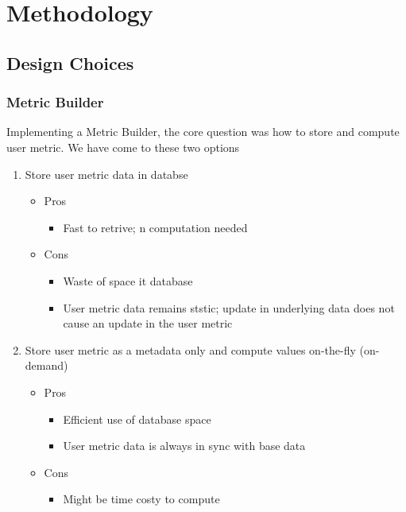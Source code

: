 \chapter{Methodology}

\section{Design Choices}

\subsection{Metric Builder}

Implementing a Metric Builder, the core question was how to store and compute user metric. We have come to these two options
\begin{enumerate}
  \item
    Store user metric data in databse
    \begin{itemize}
      \item
        Pros
        \begin{itemize}
          \item
            Fast to retrive; n computation needed
        \end{itemize}
      \item
        Cons
        \begin{itemize}
          \item
            Waste of space it database
          \item
            User metric data remains ststic; update in underlying data does not cause an update in the user metric
        \end{itemize}
    \end{itemize}
  \item
    Store user metric as a metadata only and compute values on-the-fly (on-demand)
    \begin{itemize}
      \item
        Pros
        \begin{itemize}
          \item
            Efficient use of database space
          \item
            User metric data is always in sync with base data
        \end{itemize}
      \item
        Cons
        \begin{itemize}
          \item
            Might be time costy to compute
        \end{itemize}
    \end{itemize}
\end{enumerate}

